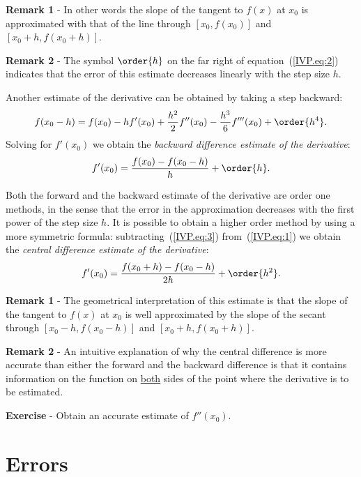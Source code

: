 \noindent
\textbf{Remark 1} - In other words the slope of the tangent to $f(x)$ at
$x_0$ is approximated with that of the line through $[x_0,f(x_0)]$ and
$[x_0+h,f(x_0+h)]$.   

\noindent
\textbf{Remark 2} - The symbol $\order{h}$ on the far right of
equation~(\ref{IVP.eq:2}) indicates that the error of this estimate
decreases linearly with the step size $h$. 

Another estimate of the derivative can be obtained by taking a step
backward:
% 
\begin{equation}
  f(x_0-h) = f(x_0) - h f'(x_0) + \frac{h^2}{2} f''(x_0) -
  \frac{h^3}{6} f'''(x_0) + \order{h^4} .
  \label{IVP.eq:3}
\end{equation}
% 
Solving for $f'(x_0)$ we obtain the \textit{backward difference
  estimate of the derivative}:
%
\begin{equation}
  f'(x_0) = \frac{f(x_0)-f(x_0-h)}{h} + \order{h} .
  \label{IVP.eq:4}
\end{equation}

Both the forward and the backward estimate of the derivative are order
one methods, in the sense that the error in the approximation
decreases with the first power of the step size $h$.  It is possible
to obtain a higher order method by using a more symmetric formula:
subtracting~(\ref{IVP.eq:3}) from~(\ref{IVP.eq:1}) we obtain the
\textit{central difference estimate of the derivative}:
%
\begin{equation}
  f'(x_0) = \frac{f(x_0+h)-f(x_0-h)}{2 h} + \order{h^2} .
  \label{IVP.eq:5}
\end{equation}

\noindent
\textbf{Remark 1} - The geometrical interpretation of this estimate is
that the slope of the tangent to $f(x)$ at $x_0$ is well approximated
by the slope of the secant through $[x_0-h,f(x_0-h)]$ and
$[x_0+h,f(x_0+h)]$.

\noindent
\textbf{Remark 2} - An intuitive explanation of why the central
difference is more accurate than either the forward and the backward
difference is that it contains information on the function on
\underline{both} sides of the point where the derivative is to be
estimated.

\noindent
\textbf{Exercise} - Obtain an accurate estimate of $f''(x_0)$.

\section{Errors}

